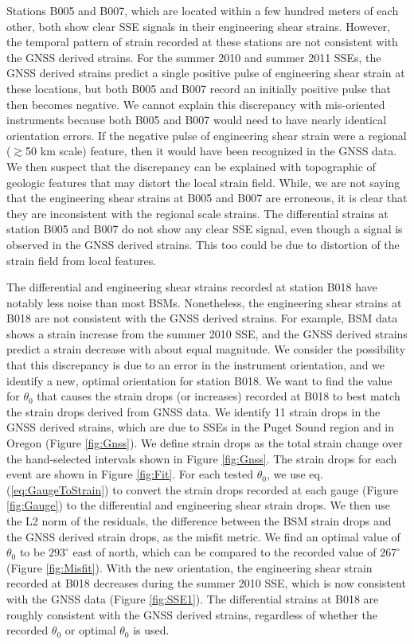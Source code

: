 Stations B005 and B007, which are located within a few hundred meters
of each other, both show clear SSE signals in their engineering shear
strains.  However, the temporal pattern of strain recorded at these
stations are not consistent with the GNSS derived strains.  For the
summer 2010 and summer 2011 SSEs, the GNSS derived strains predict a
single positive pulse of engineering shear strain at these locations,
but both B005 and B007 record an initially positive pulse that then
becomes negative. We cannot explain this discrepancy with mis-oriented
instruments because both B005 and B007 would need to have nearly
identical orientation errors. If the negative pulse of engineering
shear strain were a regional ($\gtrsim$50 km scale) feature, then it
would have been recognized in the GNSS data. We then suspect that the
discrepancy can be explained with topographic of geologic features
that may distort the local strain field. While, we are not saying that
the engineering shear strains at B005 and B007 are erroneous, it is
clear that they are inconsistent with the regional scale strains. The
differential strains at station B005 and B007 do not show any clear
SSE signal, even though a signal is observed in the GNSS derived
strains. This too could be due to distortion of the strain field from
local features.

The differential and engineering shear strains recorded at station
B018 have notably less noise than most BSMs. Nonetheless, the
engineering shear strains at B018 are not consistent with the GNSS
derived strains. For example, BSM data shows a strain increase from
the summer 2010 SSE, and the GNSS derived strains predict a strain
decrease with about equal magnitude. We consider the possibility that
this discrepancy is due to an error in the instrument orientation, and
we identify a new, optimal orientation for station B018. We want to
find the value for $\theta_0$ that causes the strain drops (or
increases) recorded at B018 to best match the strain drops derived
from GNSS data. We identify 11 strain drops in the GNSS derived
strains, which are due to SSEs in the Puget Sound region and in Oregon
(Figure \ref{fig:Gnss}). We define strain drops as the total strain
change over the hand-selected intervals shown in Figure
\ref{fig:Gnss}. The strain drops for each event are shown in Figure
\ref{fig:Fit}. For each tested $\theta_0$, we use eq.
(\ref{eq:GaugeToStrain}) to convert the strain drops recorded at each
gauge (Figure \ref{fig:Gauge}) to the differential and engineering
shear strain drops. We then use the L2 norm of the residuals, the
difference between the BSM strain drops and the GNSS derived strain
drops, as the misfit metric. We find an optimal value of $\theta_0$ to
be $293^\circ$ east of north, which can be compared to the recorded
value of $267^\circ$ (Figure \ref{fig:Misfit}). With the new
orientation, the engineering shear strain recorded at B018 decreases
during the summer 2010 SSE, which is now consistent with the GNSS data
(Figure \ref{fig:SSE1}). The differential strains at B018 are roughly
consistent with the GNSS derived strains, regardless of whether the
recorded $\theta_0$ or optimal $\theta_0$ is used.

